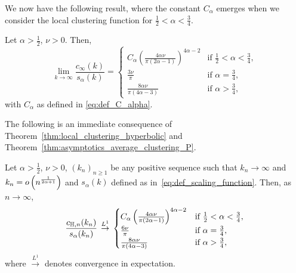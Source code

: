 We now have the following result, where the constant $C_\alpha$ emerges when we consider the local clustering function for $\frac{1}{2} < \alpha < \frac{3}{4}$.

\begin{theorem}\label{thm:asymptotics_average_clustering_P}
Let $\alpha > \frac{1}{2}$, $\nu > 0$. Then,
\[
	\lim_{k \to \infty} \frac{c_\infty(k)}{s_\alpha(k)} 
	= \begin{cases}
			C_\alpha \left(\frac{4\alpha \nu}{\pi\left(2\alpha - 1\right)}\right)^{4\alpha - 2}
			&\mbox{if } \frac{1}{2} < \alpha < \frac{3}{4},\\
			\frac{3 \nu}{\pi} &\mbox{if } \alpha = \frac{3}{4},\\
			\frac{8\alpha \nu}{\pi\left(4\alpha - 3\right)} &\mbox{if } \alpha > \frac{3}{4},
	\end{cases}
\]
with $C_\alpha$ as defined in \eqref{eq:def_C_alpha}.
\end{theorem}

The following is an immediate consequence of Theorem~\ref{thm:local_clustering_hyperbolic} and Theorem~\ref{thm:asymptotics_average_clustering_P}.

\begin{corollary}
\label{cor:asymptotic_local_clustering_hyperbolic}
Let $\alpha > \frac{1}{2}$, $\nu > 0$, $(k_n)_{n \ge 1}$ be any positive sequence such that $k_n \to \infty$ and $k_n = o\left(n^{\frac{1}{2\alpha + 1}}\right)$ and $s_\alpha(k)$ defined as in~\eqref{eq:def_scaling_function}. Then, as $n \to \infty$,
\[
	\frac{c_{\mathbb{H},n}(k_n)}{s_\alpha(k_n)} \, \stackrel{L^1}{\rightarrow} \, 
	\begin{cases}
				C_\alpha \left(\frac{4\alpha \nu}{\pi\left(2\alpha - 1\right)}\right)^{4\alpha - 2}
				&\mbox{if } \frac{1}{2} < \alpha < \frac{3}{4},\\
				\frac{6\nu}{\pi} &\mbox{if } \alpha = \frac{3}{4},\\
				\frac{8\alpha \nu}{\pi\left(4\alpha - 3\right)} &\mbox{if } \alpha > \frac{3}{4},
		\end{cases}
\]
where $\stackrel{L^1}{\to}$ denotes convergence in expectation.
\end{corollary}

